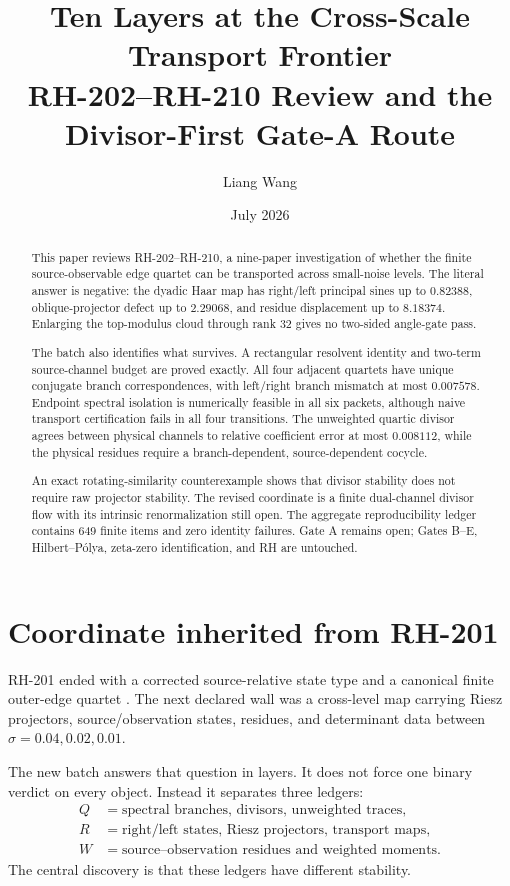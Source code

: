 \documentclass[12pt]{article}
\title{Ten Layers at the Cross-Scale Transport Frontier\\
\large RH-202--RH-210 Review and the Divisor-First Gate-A Route}
\author{Liang Wang}\date{July 2026}
\theoremstyle{remark}\newtheorem{remark}[theorem]{Remark}
\begin{document}
\maketitle
\begin{abstract}
This paper reviews RH-202--RH-210, a nine-paper investigation of whether the
finite source-observable edge quartet can be transported across small-noise
levels.  The literal answer is negative: the dyadic Haar map has right/left
principal sines up to $0.82388$, oblique-projector defect up to $2.29068$,
and residue displacement up to $8.18374$.  Enlarging the top-modulus cloud
through rank 32 gives no two-sided angle-gate pass.

The batch also identifies what survives.  A rectangular resolvent identity
and two-term source-channel budget are proved exactly.  All four adjacent
quartets have unique conjugate branch correspondences, with left/right
branch mismatch at most $0.007578$.  Endpoint spectral isolation is
numerically feasible in all six packets, although naive transport
certification fails in all four transitions.  The unweighted quartic
divisor agrees between physical channels to relative coefficient error at
most $0.008112$, while the physical residues require a branch-dependent,
source-dependent cocycle.

An exact rotating-similarity counterexample shows that divisor stability
does not require raw projector stability.  The revised coordinate is a
finite dual-channel divisor flow with its intrinsic renormalization still
open.  The
aggregate reproducibility ledger contains 649 finite items and zero identity
failures.  Gate A remains open; Gates B--E, Hilbert--P\'olya, zeta-zero
identification, and RH are untouched.
\end{abstract}

\section{Coordinate inherited from RH-201}

RH-201 ended with a corrected source-relative state type and a canonical
finite outer-edge quartet \citep{WangRH201}.  The next declared wall was a
cross-level map carrying Riesz projectors, source/observation states,
residues, and determinant data between $\sigma=0.04,0.02,0.01$.

The new batch answers that question in layers.  It does not force one binary
verdict on every object.  Instead it separates three ledgers:
\begin{equation}\label{eq:ledgers}
 \begin{aligned}
 Q&=\text{spectral branches, divisors, unweighted traces},\\
 R&=\text{right/left states, Riesz projectors, transport maps},\\
 W&=\text{source--observation residues and weighted moments}.
 \end{aligned}
\end{equation}
The central discovery is that these ledgers have different stability.
\end{document}
